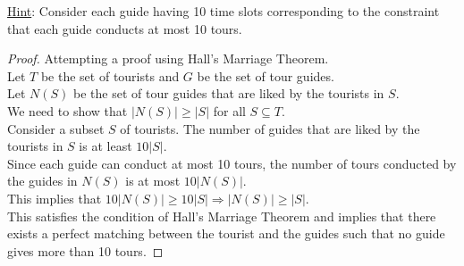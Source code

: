 \documentclass[a4paper]{exam}
\begin{document}
\begin{questions}
  \underline{Hint}: Consider each guide having 10 time slots corresponding to the constraint that each guide conducts at most 10 tours.
  \begin{solution}
    \renewcommand\qedsymbol{$\square$}
    \begin{proof}
      Attempting a proof using Hall's Marriage Theorem. \\
      Let $T$ be the set of tourists and $G$ be the set of tour guides. \\
      Let $N(S)$ be the set of tour guides that are liked by the tourists in $S$. \\
      We need to show that $|N(S)| \geq |S|$ for all $S \subseteq T$. \\
      Consider a subset $S$ of tourists. The number of guides that are liked by the tourists in $S$ is at least $10|S|$. \\
      Since each guide can conduct at most 10 tours, the number of tours conducted by the guides in $N(S)$ is at most $10|N(S)|$. \\
      This implies that $10|N(S)| \geq 10|S| \Rightarrow |N(S)| \geq |S|$. \\
      This satisfies the condition of Hall's Marriage Theorem and implies that there exists a perfect matching between the tourist and the guides such that no guide gives more than 10 tours.
    \end{proof}
  \end{solution}

\end{questions}
\end{document}
